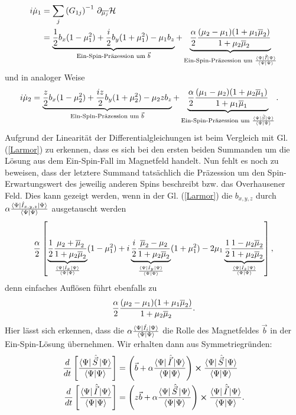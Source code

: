 \begin{align}
    i\dot{\mu}_1 &= \sum_{j}\left(G_{1j}\right)^{-1}\thinspace \partial_{\overline{\mu_j}}\mathcal{H}  \\
    &=\underbrace{\frac{1}{2}b_x(1-\mu_1^2) + \frac{i}{2}b_y(1+\mu_1^2) -\mu_1 b_z}_{\text{Ein-Spin-Präzession um } \vec{b}} +\underbrace{\frac{\alpha}{2} \frac{(\mu_2-\mu_1)(1+\mu_1\overline{\mu}_2)}{1+\mu_2\overline{\mu}_2}}_{\text{Ein-Spin-Präzession um } \frac{\bra{\Psi}\hat{\vec{I}}\ket{\Psi}}{\bra{\Psi}\ket{\Psi}}  } \label{DGL_klassisch_S}   
\end{align}
und in analoger Weise 
\begin{align}
    i\dot{\mu}_2 &= \underbrace{\frac{z}{2}b_x(1-\mu_2^2) + \frac{iz}{2}b_y(1+\mu_2^2) -\mu_2 z b_z}_{\text{Ein-Spin-Präzession um } \vec{b}} +\underbrace{\frac{\alpha}{2} \frac{(\mu_1-\mu_2)(1+\mu_2\overline{\mu}_1)}{1+\mu_1\overline{\mu}_1}}_{\text{Ein-Spin-Präzession um } \frac{\bra{\Psi}\hat{\vec{S}}\ket{\Psi}}{\bra{\Psi}\ket{\Psi}}  }.\label{DGL_klassisch_I}
\end{align}
\noindent Aufgrund der Linearität der Differentialgleichungen ist beim Vergleich mit Gl. (\ref{Larmor}) zu erkennen, dass es sich bei den ersten
beiden Summanden um die Lösung aus dem Ein-Spin-Fall im Magnetfeld handelt. Nun fehlt es noch zu beweisen, dass der letztere Summand tatsächlich die 
Präzession um den Spin-Erwartungswert des jeweilig anderen Spins beschreibt bzw. das Overhausener Feld. Dies kann gezeigt werden, wenn in 
der Gl. (\ref{Larmor}) die $b_{x,y,z}$ durch $\alpha\frac{\bra{\Psi}\hat{I}_{x,y,z}\ket{\Psi}}{\bra{\Psi}\ket{\Psi}}$ ausgetauscht
werden
\begin{align}
     \frac{\alpha}{2}\left[\underbrace{\frac{1}{2}\frac{\mu_2 + \overline{\mu}_2}{1+\mu_2\overline{\mu}_2}}_{\frac{\bra{\Psi}\hat{I}_x\ket{\Psi}}{\bra{\Psi}\ket{\Psi}}}(1-\mu_1^2) 
     + i \underbrace{\frac{i}{2}\frac{\overline{\mu}_2 -\mu_2}{1+\mu_2\overline{\mu}_2}}_{\frac{\bra{\Psi}\hat{I}_y\ket{\Psi}}{\bra{\Psi}\ket{\Psi}}}(1+\mu_1^2) 
     - 2\mu_1\underbrace{\frac{1}{2}\frac{1-\mu_2\overline{\mu}_2}{1+\mu_2\overline{\mu}_2}}_{\frac{\bra{\Psi}\hat{I}_z\ket{\Psi}}{\bra{\Psi}\ket{\Psi}}} \right],
\end{align}
denn einfaches Auflösen führt ebenfalls zu
\begin{align}
    \frac{\alpha}{2} \frac{(\mu_2-\mu_1)(1+\mu_1\overline{\mu}_2)}{1+\mu_2\overline{\mu}_2}.
\end{align}
Hier lässt sich erkennen, dass die $\alpha\frac{\bra{\Psi}\hat{I_i}\ket{\Psi}}{\bra{\Psi}\ket{\Psi}}$ die Rolle des Magnetfeldes $\vec{b}$ in der Ein-Spin-Lösung 
übernehmen. Wir erhalten dann aus Symmetriegründen:
\begin{align}
    \frac{d}{dt}\left[\frac{\bra{\Psi}\hat{\vec{S}}\ket{\Psi}}{\bra{\Psi}\ket{\Psi}}\right] &= \left(\vec{b} + \alpha \frac{\bra{\Psi}\hat{\vec{I}}\ket{\Psi}}{\bra{\Psi}\ket{\Psi}}\right)\cross\frac{\bra{\Psi}\hat{\vec{S}}\ket{\Psi}}{\bra{\Psi}\ket{\Psi}} \label{DGL_1}\\
    \frac{d}{dt}\left[\frac{\bra{\Psi}\hat{\vec{I}}\ket{\Psi}}{\bra{\Psi}\ket{\Psi}}\right] &= \left(z\vec{b} + \alpha \frac{\bra{\Psi}\hat{\vec{S}}\ket{\Psi}}{\bra{\Psi}\ket{\Psi}}\right)\cross\frac{\bra{\Psi}\hat{\vec{I}}\ket{\Psi}}{\bra{\Psi}\ket{\Psi}} \label{DGL_2}.
\end{align}


